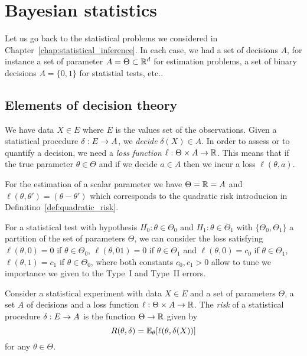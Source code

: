 


\setchapterpreamble[u]{\margintoc}
\chapter{Bayesian statistics}
\label{chap:bayesian_statistics}

Let us go back to the statistical problems we considered in Chapter~\ref{chap:statistical_inference}.
In each case, we had a set of decisions $A$, for instance a set of parameter $A = \Theta \subset \mathbb R^d$ for estimation problems, a set of binary decisions $A = \{ 0, 1 \}$ for statistial tests, etc..

\section{Elements of decision theory} %
\label{sec:elements_of_decision_theory}


We have data $X \in E$ where $E$ is the values set of the observations.
Given a statistical procedure $\delta : E \rightarrow A$, we \emph{decide} $\delta(X) \in A$.
In order to assess or to quantify a decision, we need a \emph{loss function} $\ell : \Theta \times A \rightarrow \mathbb R$.
This means that if the true parameter $\theta \in \Theta$ and if we decide $a \in A$ then we incur a loss $\ell(\theta, a)$.
\begin{example}
	For the estimation of a scalar parameter we have $\Theta = \mathbb R = A$ and $\ell(\theta, \theta') = (\theta - \theta')$ which corresponds to the quadratic risk introducion in Definitino~\ref{def:quadratic_risk}. 
\end{example}

\begin{example}
	For a statistical test with hypothesis $H_0 : \theta \in \Theta_0$ and $H_1 : \theta \in \Theta_1$ with $\{ \Theta_0, \Theta_1 \}$ a partition of the set of parameters $\Theta$, we can consider the loss satisfying $\ell(\theta, 0) = 0$ if $\theta \in \Theta_0$, $\ell(\theta, 01) = 0$ if $\theta \in \Theta_1$ and $\ell(\theta, 0) = c_0$ if $\theta \in \Theta_1$, $\ell(\theta, 1) = c_1$ if $\theta \in \Theta_0$, where both constants $c_0, c_1 > 0$ allow to tune we importance we given to the Type~I and Type~II errors.
\end{example}

\begin{definition}
	Consider a statistical experiment with data $X \in E$ and a set of parameters $\Theta$, a set $A$ of decisions and a loss function $\ell : \Theta \times A \rightarrow \mathbb R$. The \emph{risk} of a statistical procedure $\delta : E \rightarrow A$ is the function $\Theta \rightarrow \mathbb R$ given by
	\begin{equation*}
		R(\theta, \delta) = \mathbb E_\theta[ \ell(\theta, \delta(X))]
	\end{equation*}
	for any $\theta \in \Theta$.
\end{definition}

